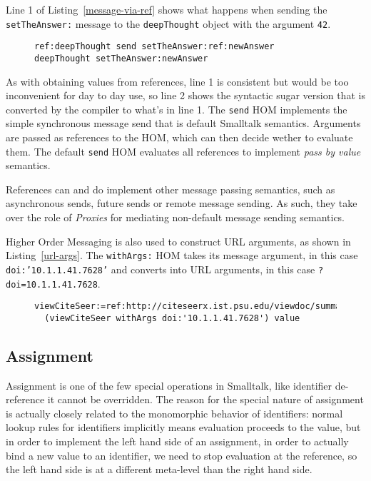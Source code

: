 \documentclass[preprint,authoryear]{llncs}
\begin{document}
  Line 1 of Listing~\ref{message-via-ref} shows
what happens when sending the {\tt setTheAnswer:} message to the {\tt deepThought} object with
the argument {\tt 42}.

\begin{figure}[htbp]
\begin{lstlisting}[style=numbers,label=message-via-ref,caption=Message sending via reference and with syntactic sugar]
ref:deepThought send setTheAnswer:ref:newAnswer
deepThought setTheAnswer:newAnswer
\end{lstlisting}
\end{figure}

As with obtaining values from references, line 1 is consistent but would be too inconvenient for day to day use,
so line 2 shows the syntactic sugar version that is converted by the compiler to what's in line 1.  The {\tt send}
HOM implements the simple synchronous message send that is default Smalltalk semantics.   Arguments
are passed as references to the HOM, which can then decide wether to evaluate them.  The default {\tt send}
HOM evaluates all references to implement \emph{pass by value} semantics.

References can and do implement other message passing semantics, such as asynchronous sends, future
sends or remote message sending.  As such, they take over the role of \emph{Proxies} for mediating non-default
message sending semantics.  


Higher Order Messaging is also used to construct URL arguments, as shown in Listing~\ref{url-args}.  The {\tt withArgs:}
HOM takes its message argument, in this case {\tt doi:'10.1.1.41.7628'} and converts into URL arguments,
in this case {\tt ?doi=10.1.1.41.7628}.

\begin{figure}[htbp]
\begin{lstlisting}[style=L,label=url-args,caption=URL arguments via reference and higher order message.]
  viewCiteSeer:=ref:http://citeseerx.ist.psu.edu/viewdoc/summary.
  (viewCiteSeer withArgs doi:'10.1.1.41.7628') value
\end{lstlisting}
\end{figure}


\subsection{Assignment}

Assignment is one of the few special operations in Smalltalk, like identifier de-reference it cannot be overridden.
The reason for the special nature of assignment is actually closely related to the monomorphic behavior
of identifiers:  normal lookup rules for identifiers implicitly means evaluation proceeds to the value, but in order to implement the left
hand side of an assignment, in order to actually bind a new value to an identifier, we need to stop evaluation
at the reference, so the left hand side is at a different meta-level than the right hand side\cite{kay-assignment}.
\end{document}
